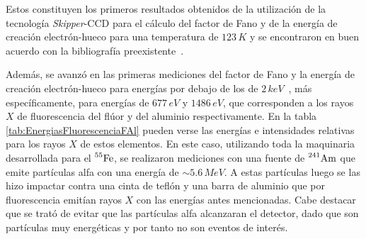 Estos constituyen los primeros resultados obtenidos de la utilización de la tecnología \textit{Skipper}-CCD para el cálculo del factor de Fano y de la energía de creación electrón-hueco para una temperatura de $123\,\si{K}$ y se encontraron en buen acuerdo con la bibliografía preexistente~\cite{Ryan, Alig, Kotov}.

Además, se avanzó en las primeras mediciones del factor de Fano y la energía de creación electrón-hueco para energías por debajo de los de $2\,\si{keV}$~\cite{TesisKevin}, más específicamente, para energías de $677\,\si{eV}$ y $1486\,\si{eV}$, que corresponden a los rayos $X$ de fluorescencia del flúor y del aluminio respectivamente. En la tabla \ref{tab:EnergiasFluorescenciaFAl} pueden verse las energías e intensidades relativas para los rayos $X$ de estos elementos. En este caso, utilizando toda la maquinaria desarrollada para el $\prescript{55}{}{\mbox{Fe}}$, se realizaron mediciones con una fuente de $\prescript{241}{}{\mbox{Am}}$ que emite partículas alfa con una energía de $\sim 5.6\,\si{MeV}$. A estas partículas luego se las hizo impactar contra una cinta de teflón y una barra de aluminio que por fluorescencia emitían rayos $X$ con las energías antes mencionadas. Cabe destacar que se trató de evitar que las partículas alfa alcanzaran el detector, dado que son partículas muy energéticas y por tanto no son eventos de interés.

